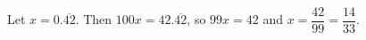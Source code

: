 Let $x=0.\overline{42}$. Then $100x=42.\overline{42}$, so $99x=42$ and $x=\dfrac{42}{99}=\boxed{\dfrac{14}{33}}$.
